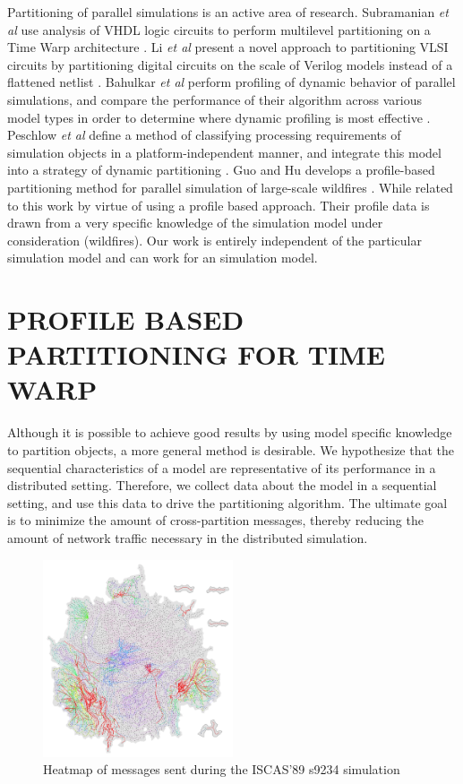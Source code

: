 \documentclass{wscpaperproc}
\begin{document}
Partitioning of parallel simulations is an active area of research. Subramanian \emph{et al} use analysis of VHDL logic circuits to perform multilevel partitioning on a Time Warp architecture \cite{subramanian-01}. Li \emph{et al} present a novel approach to partitioning VLSI circuits by partitioning digital circuits on the scale of Verilog models instead of a flattened netlist \cite{lijun-09} . Bahulkar \emph{et al} perform profiling of dynamic behavior of parallel simulations, and compare the performance of their algorithm across various model types in order to determine where dynamic profiling is most effective \cite{bahulkar-12}. Peschlow \emph{et al} define a method of classifying processing requirements of simulation objects in a platform-independent manner, and integrate this model into a strategy of dynamic partitioning \cite{peschlow-07}. Guo and Hu develops a profile-based partitioning method for parallel simulation of large-scale wildfires \cite{guo-11}. While related to this work by virtue of using a profile based approach. Their profile data is drawn from a very specific knowledge of the simulation model under consideration (wildfires). Our work is entirely independent of the particular simulation model and can work for an simulation model.

\section{PROFILE BASED PARTITIONING FOR TIME WARP}\label{sec:partitioning}

Although it is possible to achieve good results by using model specific knowledge to partition objects, a more general method is desirable. We hypothesize that the sequential characteristics of a model are representative of its performance in a distributed setting. Therefore, we collect data about the model in a sequential setting, and use this data to drive the partitioning algorithm. The ultimate goal is to minimize the amount of cross-partition messages, thereby reducing the amount of network traffic necessary in the distributed simulation.

\begin{figure}
\centering
\includegraphics[clip=true,width=0.5\textwidth]{figs/s9234_1part}
\caption{Heatmap of messages sent during the ISCAS'89 s9234
simulation}\label{fig:iscasUnpart} 
\end{figure}
\end{document}
